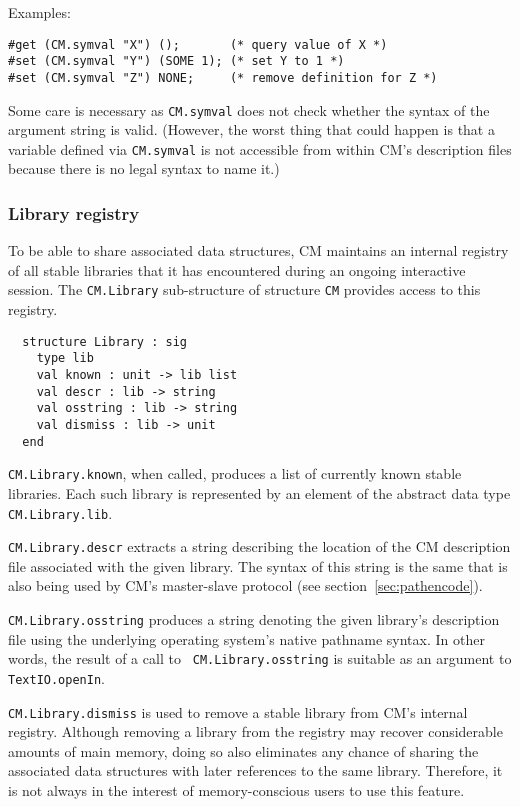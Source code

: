 \documentclass{article}
\begin{document}
\noindent Examples:
\begin{verbatim}
#get (CM.symval "X") ();       (* query value of X *)
#set (CM.symval "Y") (SOME 1); (* set Y to 1 *)
#set (CM.symval "Z") NONE;     (* remove definition for Z *)
\end{verbatim}

Some care is necessary as {\tt CM.symval} does not check whether the
syntax of the argument string is valid.  (However, the worst thing
that could happen is that a variable defined via {\tt CM.symval} is
not accessible from within CM's description files because there is no
legal syntax to name it.)

\subsubsection*{Library registry}

To be able to share associated data structures, CM maintains an
internal registry of all stable libraries that it has encountered
during an ongoing interactive session.  The {\tt CM.Library}
sub-structure of structure {\tt CM} provides access to this registry.

\begin{verbatim}
  structure Library : sig
    type lib
    val known : unit -> lib list
    val descr : lib -> string
    val osstring : lib -> string
    val dismiss : lib -> unit
  end
\end{verbatim}

{\tt CM.Library.known}, when called, produces a list of currently
known stable libraries.  Each such library is represented by an
element of the abstract data type {\tt CM.Library.lib}.

{\tt CM.Library.descr} extracts a string describing the location of
the CM description file associated with the given library.  The syntax
of this string is the same that is also being used by CM's
master-slave protocol (see section~\ref{sec:pathencode}).

{\tt CM.Library.osstring} produces a string denoting the given
library's description file using the underlying operating system's
native pathname syntax.  In other words, the result of a call to {\tt
CM.Library.osstring} is suitable as an argument to {\tt
TextIO.openIn}.

{\tt CM.Library.dismiss} is used to remove a stable library from CM's
internal registry.  Although removing a library from the registry may
recover considerable amounts of main memory, doing so also eliminates
any chance of sharing the associated data structures with later
references to the same library.  Therefore, it is not always in the
interest of memory-conscious users to use this feature.
\end{document}
